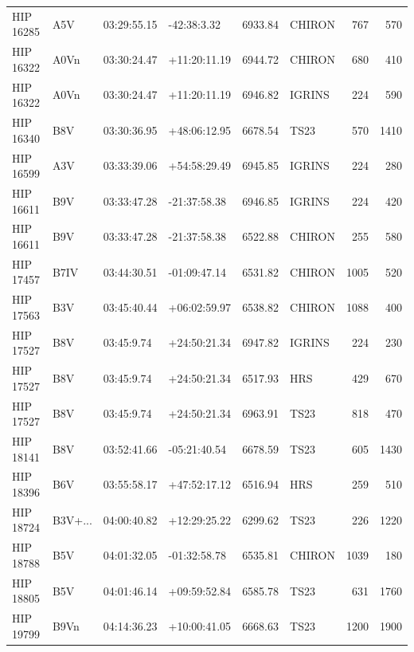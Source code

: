 \documentclass{emulateapj}
\begin{document}
\begin{longtable*}{|l|lllrlrr|}
   HIP 16285 &            A5V &    03:29:55.15 &    -42:38:3.32 &  6933.84 &     CHIRON &      767 &     570 \\
   HIP 16322 &           A0Vn &    03:30:24.47 &   +11:20:11.19 &  6944.72 &     CHIRON &      680 &     410 \\
   HIP 16322 &           A0Vn &    03:30:24.47 &   +11:20:11.19 &  6946.82 &     IGRINS &      224 &     590 \\
   HIP 16340 &            B8V &    03:30:36.95 &   +48:06:12.95 &  6678.54 &       TS23 &      570 &    1410 \\
   HIP 16599 &            A3V &    03:33:39.06 &   +54:58:29.49 &  6945.85 &     IGRINS &      224 &     280 \\
   HIP 16611 &            B9V &    03:33:47.28 &   -21:37:58.38 &  6946.85 &     IGRINS &      224 &     420 \\
   HIP 16611 &            B9V &    03:33:47.28 &   -21:37:58.38 &  6522.88 &     CHIRON &      255 &     580 \\
   HIP 17457 &           B7IV &    03:44:30.51 &   -01:09:47.14 &  6531.82 &     CHIRON &     1005 &     520 \\
   HIP 17563 &            B3V &    03:45:40.44 &   +06:02:59.97 &  6538.82 &     CHIRON &     1088 &     400 \\
   HIP 17527 &            B8V &     03:45:9.74 &   +24:50:21.34 &  6947.82 &     IGRINS &      224 &     230 \\
   HIP 17527 &            B8V &     03:45:9.74 &   +24:50:21.34 &  6517.93 &        HRS &      429 &     670 \\
   HIP 17527 &            B8V &     03:45:9.74 &   +24:50:21.34 &  6963.91 &       TS23 &      818 &     470 \\
   HIP 18141 &            B8V &    03:52:41.66 &   -05:21:40.54 &  6678.59 &       TS23 &      605 &    1430 \\
   HIP 18396 &            B6V &    03:55:58.17 &   +47:52:17.12 &  6516.94 &        HRS &      259 &     510 \\
   HIP 18724 &        B3V+... &    04:00:40.82 &   +12:29:25.22 &  6299.62 &       TS23 &      226 &    1220 \\
   HIP 18788 &            B5V &    04:01:32.05 &   -01:32:58.78 &  6535.81 &     CHIRON &     1039 &     180 \\
   HIP 18805 &            B5V &    04:01:46.14 &   +09:59:52.84 &  6585.78 &       TS23 &      631 &    1760 \\
   HIP 19799 &           B9Vn &    04:14:36.23 &   +10:00:41.05 &  6668.63 &       TS23 &     1200 &    1900 \\

\end{longtable*}
\end{document}
